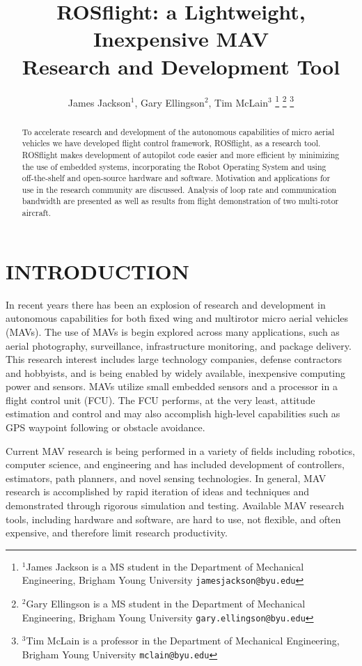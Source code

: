 \documentclass[letterpaper, 10 pt, conference]{ieeeconf}  %
\title{\LARGE \bf
ROSflight: a Lightweight, Inexpensive MAV \protect\\ Research and Development Tool
}
\author{James Jackson$^{1}$, Gary Ellingson$^{2}$, Tim McLain$^{3}$%
\thanks{$^{1}$James Jackson is a MS student in the Department of Mechanical Engineering, Brigham Young University
        {\tt\small jamesjackson@byu.edu}}%
\thanks{$^{2}$Gary Ellingson is a MS student in the Department of Mechanical Engineering, Brigham Young University
        {\tt\small gary.ellingson@byu.edu}}%
\thanks{$^{3}$Tim McLain is a professor in the Department of Mechanical Engineering, Brigham Young University
        {\tt\small mclain@byu.edu}}%
}
\begin{document}
\maketitle
\thispagestyle{empty}
\pagestyle{empty}


\begin{abstract}

To accelerate research and development of the autonomous capabilities of micro aerial vehicles we have developed flight control framework, ROSflight, as a research tool. ROSflight makes development of autopilot code easier and more efficient by minimizing the use of embedded systems, incorporating the Robot Operating System and using off-the-shelf and open-source hardware and software. Motivation and applications for use in the research community are discussed.  Analysis of loop rate and communication bandwidth are presented as well as results from flight demonstration of two multi-rotor aircraft. 

\end{abstract}


\section{INTRODUCTION}

In recent years there has been an explosion of research and development in autonomous capabilities for both fixed wing and multirotor micro aerial vehicles (MAVs).  The use of MAVs is begin explored across many applications, such as aerial photography, surveillance, infrastructure monitoring, and package delivery. This research interest includes large technology companies, defense contractors and hobbyists, and is being enabled by widely available, inexpensive computing power and sensors.  MAVs utilize small embedded sensors and a processor in a flight control unit (FCU). The FCU performs, at the very least, attitude estimation and control and may also accomplish high-level capabilities such as GPS waypoint following or obstacle avoidance.

Current MAV research is being performed in a variety of fields including robotics, computer science, and engineering and has included development of controllers, estimators, path planners, and novel sensing technologies.  In general, MAV research is accomplished by rapid iteration of ideas and techniques and demonstrated through rigorous simulation and testing.  Available MAV research tools, including hardware and software, are hard to use, not flexible, and often expensive, and therefore limit research productivity. 
\end{document}
